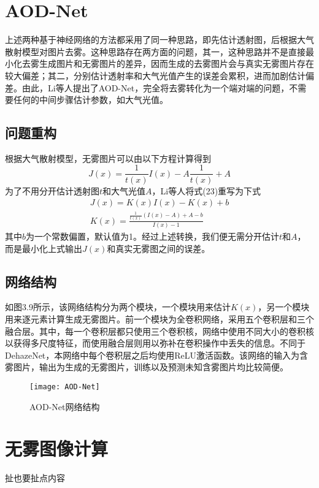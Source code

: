 \documentclass[a4paper, 12pt, oneside]{report}
\begin{document}
{\section{AOD-Net\quad}
上述两种基于神经网络的方法都采用了同一种思路，即先估计透射图，后根据大气散射模型对图片去雾。这种思路存在两方面的问题，其一，这种思路并不是直接最小化去雾生成图片和无雾图片的差异，因而生成的去雾图片会与真实无雾图片存在较大偏差；其二，分别估计透射率和大气光值产生的误差会累积，进而加剧估计偏差。由此，Li\cite{ref18}等人提出了AOD-Net，完全将去雾转化为一个端对端的问题，不需要任何的中间步骤估计参数，如大气光值。

\subsection{问题重构\quad}
根据大气散射模型，无雾图片可以由以下方程计算得到
\begin{equation}
J(x) = \frac{1}{t(x)}I(x) - A\frac{1}{t(x)} + A
\end{equation}
为了不用分开估计透射图$t$和大气光值$A$，Li等人将式(23)重写为下式
\begin{equation}
\begin{aligned}
J(x) = K(x)I(x) - K(x) + b \\
K(x) = \frac{\frac{1}{t(x)}(I(x) - A) + A - b}{I(x) - 1}
\end{aligned}
\end{equation}
其中$b$为一个常数偏置，默认值为1。经过上述转换，我们便无需分开估计$t$和$A$，而是最小化上式输出$J(x)$和真实无雾图之间的误差。

\subsection{网络结构\quad}

如图3.9所示，该网络结构分为两个模块，一个模块用来估计$K(x)$，另一个模块用来逐元素计算生成无雾图片。前一个模块为全卷积网络，采用五个卷积层和三个融合层。其中，每一个卷积层都只使用三个卷积核，网络中使用不同大小的卷积核以获得多尺度特征，而使用融合层则用以弥补在卷积操作中丢失的信息。不同于DehazeNet，本网络中每个卷积层之后均使用ReLU激活函数。该网络的输入为含雾图片，输出为生成的无雾图片，训练以及预测未知含雾图片均比较简便。
\begin{figure}[H]
\centering
\texttt{[image: AOD-Net]}
\caption{AOD-Net网络结构}
\end{figure}

\section{无雾图像计算\quad}
{\Large 扯也要扯点内容}

}
\end{document}
